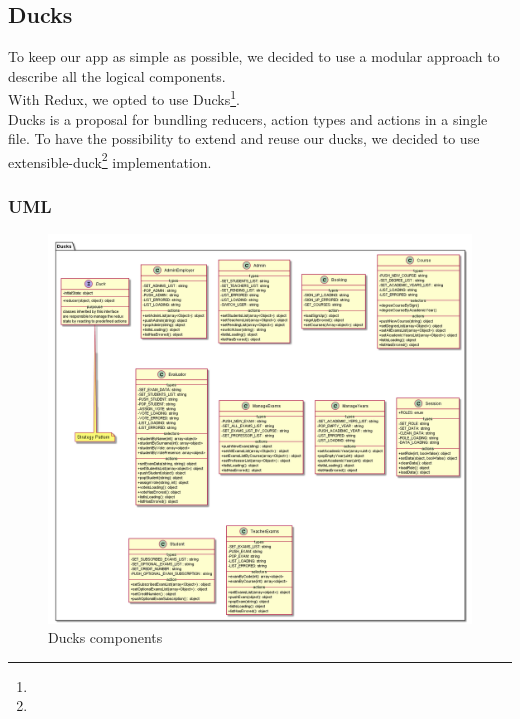 
	\subsection{Ducks}
	To keep our app as simple as possible, we decided to use a modular approach to describe all the logical components.\\
	With Redux, we opted to use Ducks\footnote{}.\\
	Ducks is a proposal for bundling reducers, action types and actions in a single file. To have the possibility to extend and reuse our ducks, we decided to use extensible-duck\footnote{} implementation.
	\subsubsection{UML}
	\begin{figure}[h]
		\centering
		\includegraphics[width=1\linewidth]{"../diagrammi/redux/ducks"}
		\caption{Ducks components}
		\label{fig:Ducks components}
	\end{figure}
